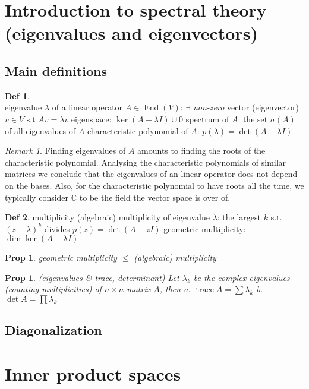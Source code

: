 \documentclass[hidelinks]{article}
\theoremstyle{definition}
\newtheorem*{defin}{Def}
\theoremstyle{plain}
\newtheorem{proposition}[theorem]{Prop}
\theoremstyle{remark}
\newtheorem*{remark}{Remark}
\DeclareMathOperator{\trace}{trace}
\DeclareMathOperator{\End}{End}
\begin{document}
\section{Introduction to spectral theory (eigenvalues and eigenvectors)}

\subsection{Main definitions}

\begin{defin}~\\
eigenvalue $\lambda$ of a linear operator $A\in \End{(V)}$: $\exists$ \emph{non-zero} vector (eigenvector) $v\in V$ s.t $Av=\lambda v$ \newline
eigenspace: $\ker(A-\lambda I)\cup 0$ \newline
spectrum of $A$: the set $\sigma(A)$ of all eigenvalues of $A$ \newline
characteristic polynomial of $A$: $p(\lambda)=\det(A-\lambda I)$
\end{defin}

\begin{remark}
Finding eigenvalues of $A$ amounts to finding the roots of the characteristic polynomial. Analysing the characteristic polynomials of similar matrices we conclude that the eigenvalues of an linear operator does not depend on the bases. Also, for the characteristic polynomial to have roots all the time, we typically consider $\mathbb{C}$ to be the field the vector space is over of.
\end{remark}

\begin{defin} multiplicity \newline
\indent (algebraic) multiplicity of eigenvalue $\lambda$: the largest $k$ s.t. $(z-\lambda)^k$ divides $p(z)=\det(A-zI)$ \newline
\indent geometric multiplicity: $\dim \ker (A-\lambda I)$
\end{defin}

\begin{proposition}
geometric multiplicity $\leq$ (algebraic) multiplicity
\end{proposition}

\begin{proposition} (eigenvalues \& trace, determinant) \newline
Let $\lambda_k$ be the complex eigenvalues (counting multiplicities) of $n\times n$ matrix $A$, then\newline
\indent a. $\trace A=\sum \lambda_k$ \newline
\indent b. $\det A=\prod \lambda_k$
\end{proposition}

\subsection{Diagonalization}

\section{Inner product spaces}
\end{document}
